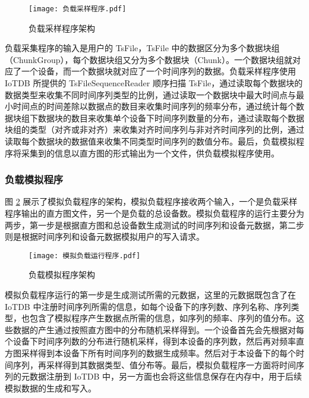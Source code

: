 \begin{figure}
  \centering
  \texttt{[image: 负载采样程序.pdf]}
  \caption{负载采样程序架构}
  \label{fig:load-sampling-program}
\end{figure}

负载采集程序的输入是用户的 TsFile，TsFile 中的数据区分为多个数据块组（ChunkGroup），每个数据块组又分为多个数据块（Chunk）。一个数据块组就对应了一个设备，而一个数据块就对应了一个时间序列的数据。负载采样程序使用 IoTDB 所提供的 TsFileSequenceReader 顺序扫描 TsFile，通过读取每个数据块的数据类型来收集不同时间序列类型的比例，通过读取一个数据块中最大时间点与最小时间点的时间差除以数据点的数目来收集时间序列的频率分布，通过统计每个数据块组下数据块的数目来收集单个设备下时间序列数量的分布，通过读取每个数据块组的类型（对齐或非对齐）来收集对齐时间序列与非对齐时间序列的比例，通过读取每个数据块的数据值来收集不同类型时间序列的数值分布。最后，负载模拟程序将采集到的信息以直方图的形式输出为一个文件，供负载模拟程序使用。

\subsubsection{负载模拟程序}
图 \ref{fig:load-simulation-program} 展示了模拟负载程序的架构，模拟负载程序接收两个输入，一个是负载采样程序输出的直方图文件，另一个是负载的总设备数。模拟负载程序的运行主要分为两步，第一步是根据直方图和总设备数生成测试的时间序列和设备元数据，第二步则是根据时间序列和设备元数据模拟用户的写入请求。

\begin{figure}
  \centering
  \texttt{[image: 模拟负载运行程序.pdf]}
  \caption{负载模拟程序架构}
  \label{fig:load-simulation-program}
\end{figure}

模拟负载程序运行的第一步是生成测试所需的元数据，这里的元数据既包含了在 IoTDB 中注册时间序列所需的信息，如每个设备下的序列数、序列名称、序列类型，也包含了模拟程序产生数据点所需的信息，如序列的频率、序列的值分布。这些数据的产生通过按照直方图中的分布随机采样得到。一个设备首先会先根据对每个设备下时间序列数的分布进行随机采样，得到本设备的序列数，然后再对频率直方图采样得到本设备下所有时间序列的数据生成频率。然后对于本设备下的每个时间序列，再采样得到其数据类型、值分布等。最后，模拟负载程序一方面将时间序列的元数据注册到 IoTDB 中，另一方面也会将这些信息保存在内存中，用于后续模拟数据的生成和写入。

